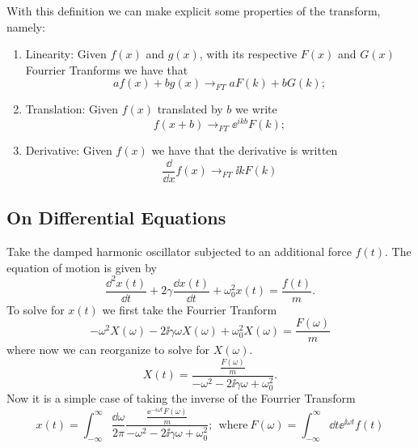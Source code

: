 With this definition we can make explicit some properties of the transform, namely:

\begin{enumerate}
	\item Linearity: Given $f(x)$ and $g(x)$, with its respective $F(x)$ and $G(x)$ Fourrier Tranforms we have that $$a f(x) + b g(x) \rightarrow_{FT} a F(k) + b G(k);$$
	\item Translation: Given $f(x)$ translated by $b$ we write  $$f(x + b) \rightarrow_{FT} \ee^{ikb} F(k);$$
	\item Derivative: Given $f(x)$ we have that the derivative is written $$\frac{\dd}{\dd x}f(x) \rightarrow_{FT}  \ii k F(k)$$
\end{enumerate}

\subsection{On Differential Equations}

Take the damped harmonic oscillator subjected to an additional force $f(t)$. The equation of motion is given by 
$$
\frac{\dd^2 x(t)}{\dd t} + 2\gamma \frac{\dd x(t)}{\dd t} + \omega_0^2 x(t) = \frac{f(t)}{m}.
$$ 
To solve for $x(t)$ we first take the Fourrier Tranform
$$
-\omega^2 X(\omega) - 2\ii \gamma \omega X(\omega) + \omega_0^2 X(\omega) = \frac{F(\omega)}{m}
$$ 
where now we can reorganize to solve for $X(\omega)$.
$$
X(t) = \frac{\frac{F(\omega)}{m}}{-\omega^2 - 2\ii \gamma \omega + \omega_0^2}.
$$
Now it is a simple case of taking the inverse of the Fourrier Transform
$$
x(t) = \int_{-\infty}^{\infty} \frac{\dd \omega}{2\pi} \frac{\frac{\ee^{-i\omega t} F(\omega)}{m}}{-\omega^2 - 2\ii \gamma \omega + \omega_0^2}; \ \ \text{where} \ F(\omega) = \int_{-\infty}^{\infty} \dd t \ee^{\ii \omega t} f(t)  
$$

